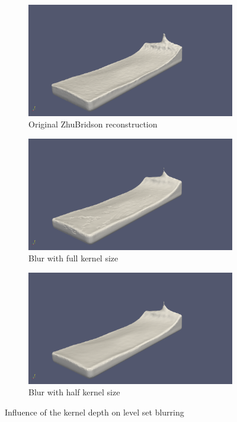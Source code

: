 \begin{figure}[H]
        \begin{subfigure}[b]{1\textwidth}
               \includegraphics[width=\textwidth]{figures/KernelDepthOriginalReconstruction.png}
               \caption{Original ZhuBridson reconstruction}
               \label{fig:kd_original}
        \end{subfigure}
        \begin{subfigure}[b]{0.5\textwidth}
               \includegraphics[width=\textwidth]{figures/KernelDepth1.png}
               \caption{Blur with full kernel size}
				\label{fig:kd_full}
        \end{subfigure}
        \begin{subfigure}[b]{0.5\textwidth}
               \includegraphics[width=\textwidth]{figures/KernelDepth0_5.png}
               \caption{Blur with half kernel size}
               \label{fig:kd_half}
        \end{subfigure}

       \caption{Influence of the kernel depth on level set blurring}
       \label{fig:kd_influence example}
 \end{figure}


